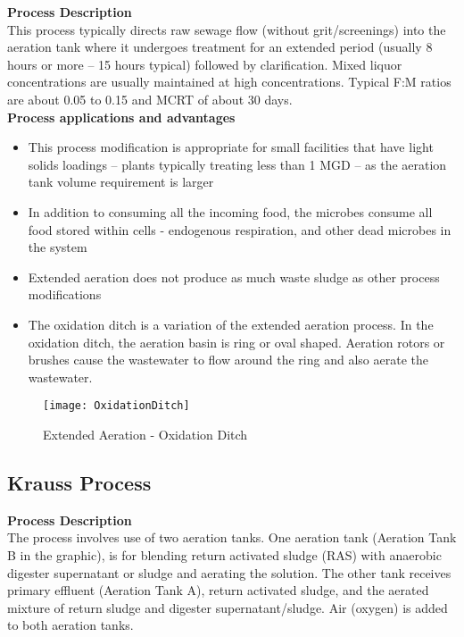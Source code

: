 \noindent \textbf{Process Description}\\
\noindent This process typically directs raw sewage flow (without grit/screenings) into the aeration tank where it undergoes treatment for an extended period (usually 8 hours or more – 15 hours typical) followed by clarification.  Mixed liquor concentrations are usually maintained at high concentrations.  Typical F:M ratios are about 0.05 to 0.15 and MCRT of about 30 days.\\

\noindent \textbf{Process applications and advantages}
\begin{itemize}
\item This process modification is appropriate for small facilities that have light solids loadings – plants typically treating less than 1 MGD – as the aeration tank volume requirement is larger
\item In addition to consuming all the incoming food, the microbes consume all food stored within cells - endogenous respiration, and other dead microbes in the system
\item Extended aeration does not produce as much waste sludge as other process modifications
\item The oxidation ditch is a variation of the extended aeration process.  In the oxidation ditch, the aeration basin is ring or oval shaped.  Aeration rotors or brushes cause the wastewater to flow around the ring and also aerate the wastewater.
\end{itemize}

\begin{figure}[h!]
\begin{center}
\texttt{[image: OxidationDitch]}
\caption{Extended Aeration - Oxidation Ditch}
\end{center}
\end{figure}



\subsection{Krauss Process}

\noindent \textbf {Process Description}\\
\noindent The process involves use of two aeration tanks.  One aeration tank (Aeration Tank B in the graphic), is for blending return activated sludge (RAS) with anaerobic digester supernatant or sludge and aerating the solution.  The other tank receives primary effluent (Aeration Tank A), return activated sludge, and the aerated mixture of return sludge and digester supernatant/sludge.  Air (oxygen) is added to both aeration tanks.\\

